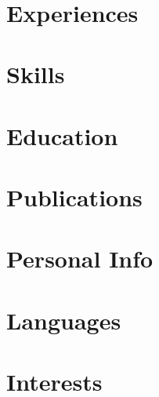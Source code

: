\documentclass[a4paper, oneside, final]{scrartcl}
\begin{document}
\begin{center}
 
\textsc{\Huge{}}
 
\section{Experiences}
\section{Skills}
\section{Education}
\section{Publications}
\section{Personal Info}
\section{Languages}
\section{Interests}
 
\end{center}
\end{document}
